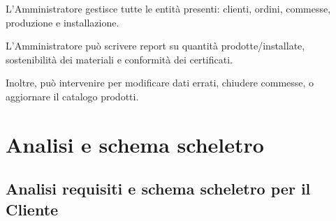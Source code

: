 \documentclass{article}
\begin{document}
\noindent L'Amministratore gestisce tutte le entità presenti: clienti, ordini, commesse, produzione e installazione.

\noindent L’Amministratore può scrivere report su quantità prodotte/installate, sostenibilità dei materiali e conformità dei certificati.

\noindent Inoltre, può intervenire per modificare dati errati, chiudere commesse, o aggiornare il catalogo prodotti.

\section{Analisi e schema scheletro}
\subsection{Analisi requisiti e schema scheletro per il Cliente}
\end{document}
